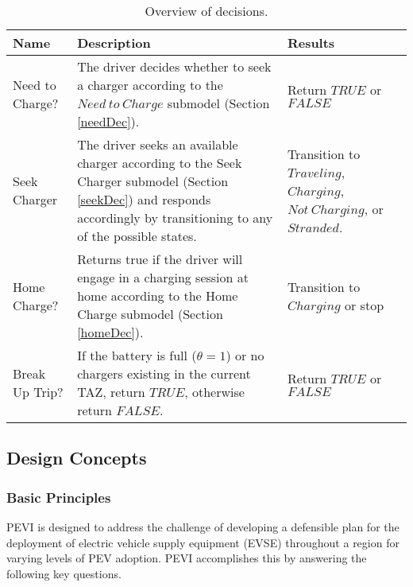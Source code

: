 \documentclass[journal]{IEEEtran}
\begin{document}
\begin{table}[!h]
\def\colmarginA{1cm}
\def\colmarginB{4cm}
\def\colmarginC{2.5cm}
\renewcommand{\arraystretch}{1.3}
\caption{Overview of decisions.}
\label{tab:decisions}
\centering
\begin{tabular}{|lll|}
\hline
Name & Description & Results \\
\hline
\parbox[t]{\colmarginA}{ \raggedright Need to Charge?}  & \parbox[t]{\colmarginB}{ \raggedright The driver decides whether to seek a charger according to the $Need ~to ~Charge$ submodel (Section \ref{needDec}).}  & \parbox[t]{\colmarginC}{ \raggedright Return $TRUE$ or $FALSE$}\\
\parbox[t]{\colmarginA}{ \raggedright Seek Charger}  & \parbox[t]{\colmarginB}{ \raggedright The driver seeks an available charger according to the Seek Charger submodel (Section \ref{seekDec}) and responds accordingly by transitioning to any of the possible states.} & \parbox[t]{\colmarginC}{ \raggedright Transition to $Traveling$, $Charging$, $Not ~Charging$, or $Stranded$.}\\
\parbox[t]{\colmarginA}{ \raggedright Home Charge?}  & \parbox[t]{\colmarginB}{ \raggedright Returns true if the driver will engage in a charging session at home according to the Home Charge submodel (Section \ref{homeDec}).} & \parbox[t]{\colmarginC}{ \raggedright Transition to $Charging$ or stop}\\
\parbox[t]{\colmarginA}{ \raggedright Break Up Trip?}  & \parbox[t]{\colmarginB}{ \raggedright If the battery is full ($\theta = 1$) or no chargers existing in the current TAZ, return $TRUE$, otherwise return $FALSE$.} & \parbox[t]{\colmarginC}{ \raggedright Return $TRUE$ or $FALSE$}\\
\hline
\end{tabular}
\end{table}

\subsection{Design Concepts}

\subsubsection{Basic Principles}

PEVI is designed to address the challenge of developing a defensible plan for the deployment of electric vehicle supply equipment (EVSE) throughout a region for varying levels of PEV adoption.  PEVI accomplishes this by answering the following key questions.  
\end{document}
